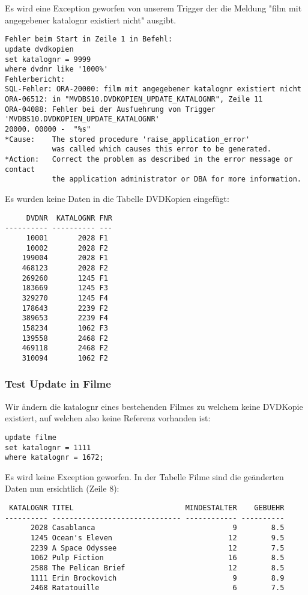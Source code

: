 \documentclass[11pt,a4paper,parskip=half]{scrartcl}
\begin{document}
Es wird eine Exception geworfen von unserem Trigger der die Meldung "film mit angegebener katalognr existiert nicht" ausgibt.

\begin{lstlisting}
Fehler beim Start in Zeile 1 in Befehl:
update dvdkopien
set katalognr = 9999
where dvdnr like '1000%'
Fehlerbericht:
SQL-Fehler: ORA-20000: film mit angegebener katalognr existiert nicht
ORA-06512: in "MVDBS10.DVDKOPIEN_UPDATE_KATALOGNR", Zeile 11
ORA-04088: Fehler bei der Ausfuehrung von Trigger 'MVDBS10.DVDKOPIEN_UPDATE_KATALOGNR'
20000. 00000 -  "%s"
*Cause:    The stored procedure 'raise_application_error'
           was called which causes this error to be generated.
*Action:   Correct the problem as described in the error message or contact
           the application administrator or DBA for more information.
\end{lstlisting}

Es wurden keine Daten in die Tabelle DVDKopien eingefügt:

\begin{lstlisting}
     DVDNR  KATALOGNR FNR
---------- ---------- ---
     10001       2028 F1  
     10002       2028 F2  
    199004       2028 F1  
    468123       2028 F2  
    269260       1245 F1  
    183669       1245 F3  
    329270       1245 F4  
    178643       2239 F2  
    389653       2239 F4  
    158234       1062 F3  
    139558       2468 F2  
    469118       2468 F2  
    310094       1062 F2  
\end{lstlisting}

\subsubsection{Test Update in Filme}
Wir ändern die katalognr eines bestehenden Filmes zu welchem keine DVDKopie existiert, auf welchen also keine Referenz vorhanden ist:

\begin{lstlisting}
update filme
set katalognr = 1111
where katalognr = 1672;
\end{lstlisting}

Es wird keine Exception geworfen. In der Tabelle Filme sind die geänderten Daten nun ersichtlich (Zeile 8):

\begin{lstlisting}
 KATALOGNR TITEL                          MINDESTALTER    GEBUEHR
---------- ------------------------------ ------------ ----------
      2028 Casablanca                                9        8.5 
      1245 Ocean's Eleven                           12        9.5 
      2239 A Space Odyssee                          12        7.5 
      1062 Pulp Fiction                             16        8.5 
      2588 The Pelican Brief                        12        8.5 
      1111 Erin Brockovich                           9        8.9 
      2468 Ratatouille                               6        7.5 
\end{lstlisting}
\end{document}
